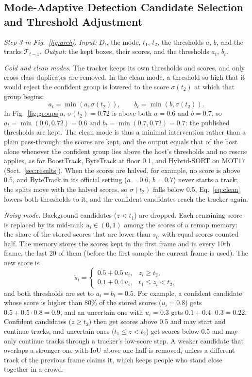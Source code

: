 \documentclass[pdflatex,sn-mathphys-num,iicol]{sn-jnl}
\begin{document}
\subsection{Mode-Adaptive Detection Candidate Selection and Threshold Adjustment}\label{sec:choice}
\emph{Step 3 in Fig.~\ref{fig:arch}. Input:} $D_t$, the mode, $t_1$, $t_2$, the thresholds $a$, $b$, and the tracks
$\mathcal{T}_{t-1}$. \emph{Output:} the kept boxes, their scores, and the thresholds $a_t$, $b_t$.

\emph{Cold and clean modes.} The tracker keeps its own thresholds and scores, and only cross-class
duplicates are removed. In the clean mode, a threshold so high that it would reject the confident
group is lowered to the score $\sigma(t_2)$ at which that group begins:
\begin{equation}
a_t=\min\!\left(a,\sigma(t_2)\right),\qquad b_t=\min\!\left(b,\sigma(t_2)\right).
\label{eq:clean}
\end{equation}
In Fig.~\ref{fig:groups}a, $\sigma(t_2)=0.72$ is above both $a=0.6$ and $b=0.7$, so
$a_t=\min(0.6,0.72)=0.6$ and $b_t=\min(0.7,0.72)=0.7$: the published thresholds are kept. The clean
mode is thus a minimal intervention rather than a plain pass-through: the scores are
kept, and the output equals that of the host alone whenever the confident group lies above the
host's thresholds and no rescue applies, as for BoostTrack, ByteTrack at floor 0.1, and Hybrid-SORT
on MOT17 (Sect.~\ref{sec:results}). When the scores are halved, for example, no score is above 0.5,
and ByteTrack in its official setting ($a=0.6$, $b=0.7$) never starts a track; the splits move with
the halved scores, so $\sigma(t_2)$ falls below 0.5, Eq.~\eqref{eq:clean} lowers both thresholds to
it, and the confident candidates reach the tracker again.

\emph{Noisy mode.} Background candidates ($z<t_1$) are dropped. Each remaining score is
replaced by its mid-rank $u_i\in(0,1)$ among the scores of a remap memory: the share of the stored
scores that are lower than $s_i$, with equal scores counted half. The memory stores the scores
kept in the first frame and in every 10th frame, the last 20 of them (before the first sample the
current frame is used). The new score is
\begin{equation}
\tilde{s}_i=
\begin{cases}
0.5+0.5\,u_i, & z_i\ge t_2,\\
0.1+0.4\,u_i, & t_1\le z_i<t_2,
\end{cases}
\label{eq:remap}
\end{equation}
and both thresholds are set to $a_t=b_t=0.5$. For example, a confident candidate whose score is
higher than 80\% of the stored scores ($u_i=0.8$) gets $0.5+0.5\cdot0.8=0.9$, and an uncertain one
with $u_i=0.3$ gets $0.1+0.4\cdot0.3=0.22$. Confident candidates ($z\ge t_2$) then get scores above 0.5
and may start and continue tracks, and uncertain ones ($t_1\le z<t_2$) get scores below 0.5 and may
only continue tracks through a tracker's low-score step. A weaker
candidate that overlaps a stronger one with IoU above one half is removed, unless a different track
of the previous frame claims it, which keeps people who stand close together in a crowd.
\end{document}

